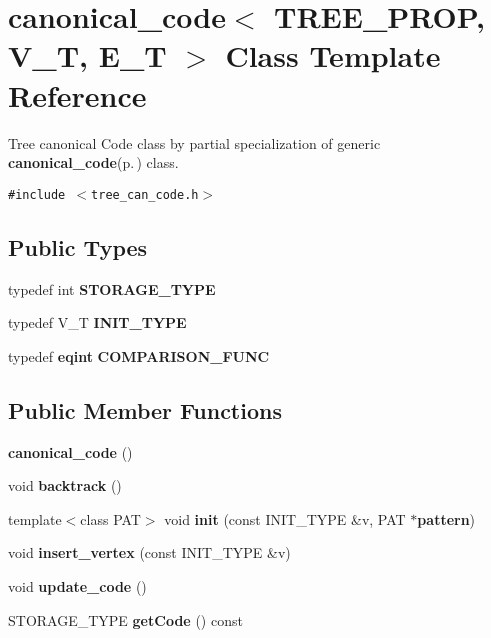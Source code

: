 \section{canonical\_\-code$<$ TREE\_\-PROP, V\_\-T, E\_\-T $>$ Class Template Reference}
\label{classcanonical__code_3_01TREE__PROP_00_01V__T_00_01E__T_01_4}
Tree canonical Code class by partial specialization of generic {\bf canonical\_\-code}{\rm (p.\,\pageref{classcanonical__code})} class.  


{\tt \#include $<$tree\_\-can\_\-code.h$>$}

\subsection*{Public Types}
\begin{CompactItemize}
\item 
typedef int {\bf STORAGE\_\-TYPE}\label{classcanonical__code_3_01TREE__PROP_00_01V__T_00_01E__T_01_4_w0}

\item 
typedef V\_\-T {\bf INIT\_\-TYPE}\label{classcanonical__code_3_01TREE__PROP_00_01V__T_00_01E__T_01_4_w1}

\item 
typedef {\bf eqint} {\bf COMPARISON\_\-FUNC}\label{classcanonical__code_3_01TREE__PROP_00_01V__T_00_01E__T_01_4_w2}

\end{CompactItemize}
\subsection*{Public Member Functions}
\begin{CompactItemize}
\item 
{\bf canonical\_\-code} ()\label{classcanonical__code_3_01TREE__PROP_00_01V__T_00_01E__T_01_4_a0}

\item 
void {\bf backtrack} ()\label{classcanonical__code_3_01TREE__PROP_00_01V__T_00_01E__T_01_4_a1}

\item 
template$<$class PAT$>$ void {\bf init} (const  INIT\_\-TYPE \&v, PAT $\ast${\bf pattern})\label{classcanonical__code_3_01TREE__PROP_00_01V__T_00_01E__T_01_4_a2}

\item 
void {\bf insert\_\-vertex} (const  INIT\_\-TYPE \&v)\label{classcanonical__code_3_01TREE__PROP_00_01V__T_00_01E__T_01_4_a3}

\item 
void {\bf update\_\-code} ()\label{classcanonical__code_3_01TREE__PROP_00_01V__T_00_01E__T_01_4_a4}

\item 
STORAGE\_\-TYPE {\bf get\-Code} () const \label{classcanonical__code_3_01TREE__PROP_00_01V__T_00_01E__T_01_4_a5}

\end{CompactItemize}



